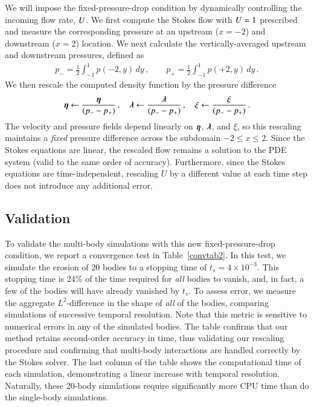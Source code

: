 \documentclass[preprint, 10pt]{elsarticle}
\begin{document}
We will impose the fixed-pressure-drop condition by dynamically controlling the incoming flow rate, $U$. We first compute the Stokes flow with $U = 1$ prescribed and measure the corresponding pressure at an upstream ($x = -2$) and downstream ($x=2$) location. We next calculate the vertically-averaged upstream and downstream pressures, defined as
\begin{align}
p_{-} = \frac{1}{2} \int_{-1}^{1} p(-2,y) \, dy \, , \qquad
p_{+} = \frac{1}{2} \int_{-1}^{1} p(+2,y) \, dy \, .
\end{align}
We then rescale the computed density function by the pressure difference
\begin{align}
{\boldsymbol\eta} \leftarrow \frac{{\boldsymbol\eta}}{(p_{-} - p_{+})}\, , \quad 
{\boldsymbol\lambda} \leftarrow \frac{{\boldsymbol\lambda}}{(p_{-} - p_{+})}\, , \quad 
\xi \leftarrow \frac{\xi}{(p_{-} - p_{+})}\, .
\end{align}
The velocity and pressure fields depend linearly on ${\boldsymbol\eta}$, ${\boldsymbol\lambda}$, and $\xi$, so this rescaling maintains a {\em fixed} pressure difference across the subdomain $-2 \le x \le 2$. Since the Stokes equations are linear, the rescaled flow remains a solution to the PDE system (valid to the same order of accuracy). Furthermore, since the Stokes equations are time-independent, rescaling $U$ by a different value at each time step does not introduce any additional error.

\subsection{Validation}

To validate the multi-body simulations with this new fixed-pressure-drop condition, we report a convergence test in Table~\ref{convtab2}. In this test, we simulate the erosion of 20 bodies to a stopping time of $t_s = 4 \times 10^{-3}$. This stopping time is 24\% of the time required for {\em all} bodies to vanish, and, in fact, a few of the bodies will have already vanished by $t_s$. To assess error, we measure the aggregate $L^2$-difference in the shape of {\em all} of the bodies, comparing simulations of successive temporal resolution. Note that this metric is sensitive to numerical errors in any of the simulated bodies. The table confirms that our method retains second-order accuracy in time, thus validating our rescaling procedure and confirming that multi-body interactions are handled correctly by the Stokes solver. The last column of the table shows the computational time of each simulation, demonstrating a linear increase with temporal resolution. Naturally, these 20-body simulations require significantly more CPU time than do the single-body simulations.
\end{document}
